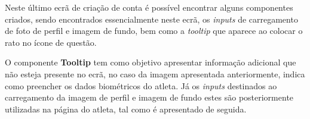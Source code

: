 Neste último ecrã de criação de conta é possível encontrar alguns componentes criados, sendo encontrados essencialmente neste ecrã, os \textit{inputs} de carregamento de foto de perfil e imagem de fundo, bem como a \textit{tooltip} que aparece ao colocar o rato no ícone de questão.

\begin{minipage}{0.45\textwidth}
\end{minipage}
\begin{minipage}{0.45\textwidth}
\end{minipage}

O componente \textbf{Tooltip} tem como objetivo apresentar informação adicional que não esteja presente no ecrã, no caso da imagem apresentada anteriormente, indica como preencher os dados biométricos do atleta. Já os \textit{inputs} destinados ao carregamento da imagem de perfil e imagem de fundo estes são posteriormente utilizadas na página do atleta, tal como é apresentado de seguida.

